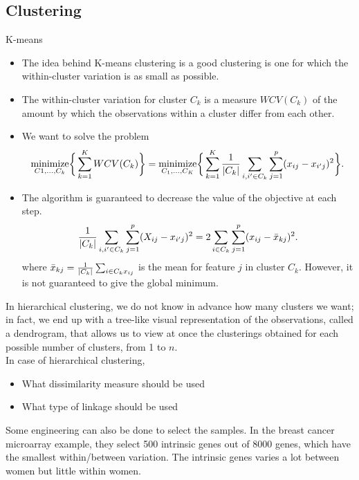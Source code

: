 \documentclass[11pt, a4paper]{article}
\begin{document}
\subsection{Clustering}
K-means
\begin{itemize}
  \item The idea behind K-means clustering is a good clustering is one for which the within-cluster variation is as small as possible.
  \item The within-cluster variation for cluster $C_k$ is a measure $WCV(C_k)$ of the amount by which the observations within a cluster differ from each other.
  \item We want to solve the problem
\begin{align}
\underset{C1,\dots,C_k}{\operatorname{minimize}}\bigg\{\sum_{k=1}^K WCV(C_k)\bigg\}
  =\underset{C_1,\dots,C_K}{\operatorname{minimize}}\bigg\{\sum_{k=1}^K {1\over |C_k|}\sum_{i,i'\in C_k}\sum_{j=1}^p (x_{ij}-x_{i' j})^2 \bigg\}.
\end{align}
\item The algorithm is guaranteed to decrease the value of the objective at each step. 
  \[
    {1\over |C_k|}\sum_{i,i'\in C_k}\sum^p_{j=1}(X_{ij}-x_{i'j})^2=2\sum_{i\in C_k}\sum_{j=1}^p(x_{ij}-\bar{x}_{kj})^2.
  \]
  where $\bar{x}_{kj}={1\over |C_k|}\sum_{i\in C_k x_{ij}}$ is the mean for feature $j$ in cluster $C_k$. However, it is not guaranteed to give the global minimum.
\end{itemize}
In hierarchical clustering, we do not know in advance how many clusters we want; in fact, we end up with a tree-like visual representation of the observations, called a dendrogram, that allows us to view at once the clusterings obtained for each possible number of clusters, from 1 to $n$.\\
In case of hierarchical clustering,
\begin{itemize}
\item What dissimilarity measure should be used
\item What type of linkage should be used
\end{itemize}
Some engineering can also be done to select the samples. In the breast cancer microarray example, they select 500 intrinsic genes out of 8000 genes, which have the smallest within/between variation. The intrinsic genes varies a lot between women but little within women.
\end{document}
